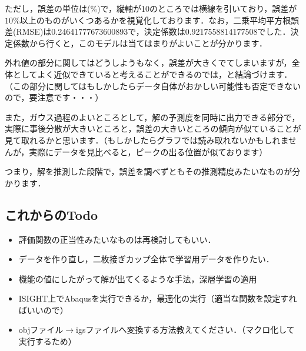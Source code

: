 \documentclass[11pt]{jsarticle}
\begin{document}
			ただし，誤差の単位は($ \% $)で，縦軸が10のところでは横線を引いており，誤差が$ 10\% $以上のものがいくつあるかを視覚化しております．なお，二乗平均平方根誤差(RMSE)は0.24641777673600893で，決定係数は0.9217558814177508でした．決定係数から行くと，このモデルは当てはまりがよいことが分かります．
			
			外れ値の部分に関してはどうしようもなく，誤差が大きくでてしまいますが，全体としてよく近似できていると考えることができるのでは，と結論づけます．（この部分に関してはもしかしたらデータ自体がおかしい可能性も否定できないので，要注意です・・・）
			
			また，ガウス過程のよいところとして，解の予測度を同時に出力できる部分で，実際に事後分散が大きいところと，誤差の大きいところの傾向が似ていることが見て取れるかと思います．（もしかしたらグラフでは読み取れないかもしれませんが，実際にデータを見比べると，ピークの出る位置が似ております）
			
			つまり，解を推測した段階で，誤差を調べずともその推測精度みたいなものが分かります．
				
		\subsection{これからのTodo}
			\begin{itemize}
				\item 評価関数の正当性みたいなものは再検討してもいい．
				\item データを作り直し，二枚接ぎカップ全体で学習用データを作りたい．
				\item 機能の値にしたがって解が出てくるような手法，深層学習の適用
				\item ISIGHT上でAbaqusを実行できるか，最適化の実行（適当な関数を設定すればいいので）
				\item objファイル$\rightarrow$igsファイルへ変換する方法教えてください．（マクロ化して実行するため）
			\end{itemize}
			
	\newpage
\vspace{10cm}
	

\vspace{14cm}
	\articleSPRfour
	\articleSPRfive
\end{document}
